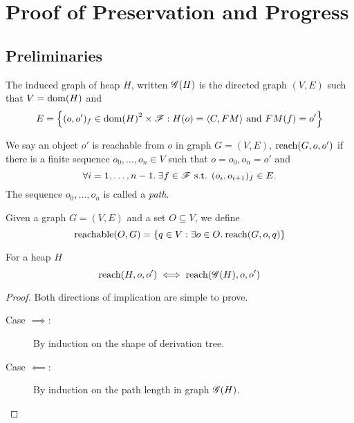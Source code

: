 \chapter{Proof of Preservation and Progress}
\label{cha:proof_of_pnp}

\section{Preliminaries}%
\label{sec:preliminaries}

\begin{definition}
  The induced graph of heap $H$, written $\mathscr{G}{(H)}$ is the directed graph
  $(V, E)$ such that $V = \mbox{$\mathrm{dom}$}{(H)}$ and 
  \begin{equation}
    E = \left\{ (o, o')_f \in \mbox{$\mathrm{dom}$}{(H)}^2 \times \mathscr{F}: 
      H(o) = \mbox{$\langle C, FM \rangle$} \text{ and } FM(f) = o' \right\}
  \end{equation}
\end{definition}

\begin{definition}
  We say an object $o'$ is reachable from $o$ in graph $G = (V,
  E)$, $\mbox{$\mathrm{reach}$}{(G, o, o')}$ if there is a finite sequence $o_0, \dots,
  o_n \in V$ such that $o = o_0, o_n = o'$ and
  \begin{equation}
    \forall i = 1,\dots, n-1. \: \exists f \in \mathscr{F} \text{ s.t. } (o_i,
    o_{i+1})_f \in E.
  \end{equation}
  The sequence $o_0, \dots, o_n$ is called a \emph{path}.
\end{definition}

\begin{definition}
  Given a graph $G = (V, E)$ and a set $O \subseteq V$, we define
  \begin{equation}
    \mbox{$\mathrm{reachable}$}{(O, G)} = \left\{ q \in V: \exists o\in O.\: \mbox{$\mathrm{reach}$}{(G, o, q)}
    \right\} \notag
  \end{equation}
\end{definition}

\begin{proposition}
  \label{prop:reacheq}
  For a heap $H$ 
  \begin{equation}
    \mbox{$\mathrm{reach}$}{(H, o, o')} \iff \mbox{$\mathrm{reach}$}{(\ensuremath{\mathscr{G}}{(H)}, o, o')}
  \end{equation}
\end{proposition}

\begin{proof}
  Both directions of implication are simple to prove.
  \begin{description}
    \item[Case $\implies$:] By induction on the shape of derivation tree.
    \item[Case $\impliedby$:] By induction on the path length in graph
      $\mathscr{G}{(H)}$.
  \end{description}
\end{proof}

